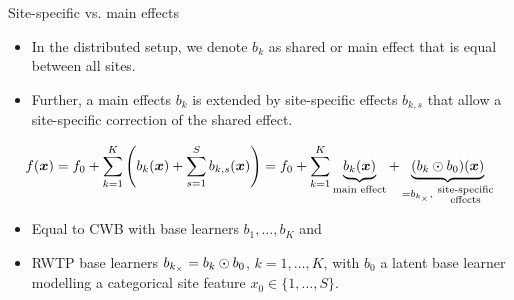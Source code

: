 \documentclass[t,10pt]{beamer}
\newcommand{\todo}{{\color{red}\textbf{TODO:}}\hspace{0.1cm}}
\begin{document}
\begin{frame}{Site-specific vs. main effects}
  \begin{itemize}
    \item
      In the distributed setup, we denote $b_k$ as shared or main effect that is equal between all sites.

    \item
      Further, a main effects $b_k$ is extended by site-specific effects $b_{k,s}$ that allow a site-specific correction of the shared effect.
  \end{itemize}
  \[f(\xv) = f_0 + \sum_{k=1}^K\left(b_k(\xv) + \sum_{s=1}^S b_{k,s}(\xv)\right) = f_0 + \sum_{k=1}^K \underbrace{b_k(\xv)}_{\text{main effect}} + \underbrace{(b_k \odot b_0)(\xv)}_{=b_{\lsite},\ \substack{\text{site-specific} \\ \text{effects}}}\]
  \begin{itemize}
        \item 
            Equal to CWB with base learners $b_1, \dots, b_K$ and 
        \item 
            RWTP base learners $b_{k_\times} = b_k \odot b_0$, $k = 1, \dots, K$, with $b_0$ a latent base learner modelling a categorical site feature $x_0\in\{1, \dots, S\}$.
  \end{itemize}
\end{frame}

\end{document}
